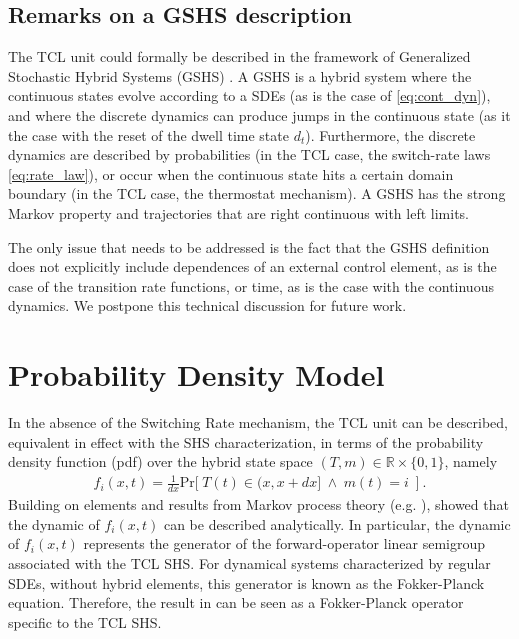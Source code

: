 \documentclass[submission,copyright,creativecommons]{eptcs}
\begin{document}
\subsection{Remarks on a GSHS description}

The TCL unit could formally be described in the framework of Generalized Stochastic Hybrid Systems (GSHS) \cite{bujorianu2006toward}.
A GSHS is a hybrid system where the continuous states evolve according to a SDEs (as is the case of \eqref{eq:cont_dyn}), 
and where the discrete dynamics can produce jumps in the continuous state (as it the case with the reset of the dwell time state $d_t$).
Furthermore, the discrete dynamics are described by probabilities (in the TCL case, the switch-rate laws \eqref{eq:rate_law}), 
or occur when the continuous state hits a certain domain boundary (in the TCL case, the thermostat mechanism). 
A GSHS has the strong Markov property and trajectories that are right continuous with left limits.

The only issue that needs to be addressed is the fact that the GSHS definition does not explicitly include dependences of an external control element, 
as is the case of the transition rate functions, or time, as is the case with the continuous dynamics. We postpone this technical discussion for future work.

\section{Probability Density Model}  \label{sec:pde_models}

In the absence of the Switching Rate mechanism, the TCL unit can be described, equivalent in effect with the SHS characterization,
in terms of the probability density function (pdf) over the hybrid state space $(T,m) \in \mathbb{R}\times \{0,1\}$, namely
\begin{align}
     f_i(x,t) = \frac{1}{ dx} \mathrm{Pr}\big[  \hspace{3pt}T(t) \in ( x, x + dx] \hspace{3pt} \wedge \hspace{3pt} m(t)=i  \hspace{3pt}~\big]~. \label{def:pdf}
\end{align} 
Building on elements and results from Markov process theory (e.g. \cite{dynkin1965markov,gardiner1985handbook}), \cite{malhame1985electric} showed that the dynamic of $f_i(x,t)$ can be described analytically. In particular, the dynamic of  $f_i(x,t)$ represents the generator of the forward-operator linear semigroup associated with the TCL  SHS. For dynamical systems characterized by regular SDEs, without hybrid elements, this generator is known as the Fokker-Planck equation. Therefore, the result in \cite{malhame1985electric} can be seen as a Fokker-Planck operator specific to the TCL SHS.
\end{document}

